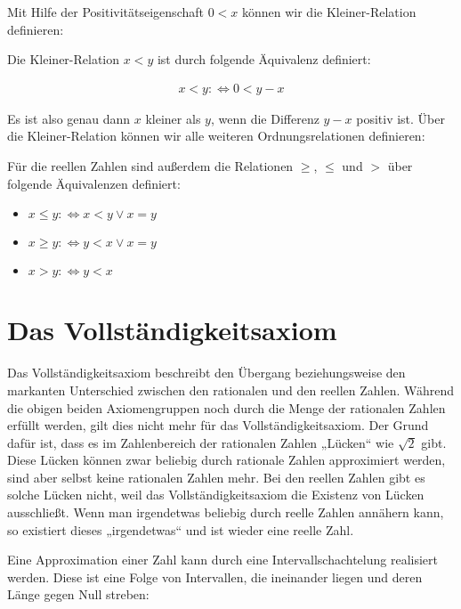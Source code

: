 \documentclass[fontsize=9pt,
               parskip=half-,
               DIV=14,
               listof=chapterentry,
               tocflat]{scrbook}
\begin{document}
Mit Hilfe der Positivitätseigenschaft $0<x$ können wir die Kleiner-Relation definieren:

\begin{definition*}
Die Kleiner-Relation $x<y$ ist durch folgende Äquivalenz definiert:

\begin{align*}
x<y:\iff 0<y-x
\end{align*}

\end{definition*}

Es ist also genau dann $x$ kleiner als $y$, wenn die Differenz $y-x$ positiv ist. Über die Kleiner-Relation können wir alle weiteren Ordnungsrelationen definieren:

\begin{definition*}
Für die reellen Zahlen sind außerdem die Relationen $\geq $, $\leq $ und $>$ über folgende Äquivalenzen definiert:

\begin{itemize}
\item $x\leq y:\iff x<y\lor x=y$
\item $x\geq y:\iff y<x\lor x=y$
\item $x>y:\iff y<x$
\end{itemize}

\end{definition*}

\section{Das Vollständigkeitsaxiom}

Das Vollständigkeitsaxiom beschreibt den Übergang beziehungsweise den markanten Unterschied zwischen den rationalen und den reellen Zahlen. Während die obigen beiden Axiomengruppen noch durch die Menge der rationalen Zahlen erfüllt werden, gilt dies nicht mehr für das Vollständigkeitsaxiom. Der Grund dafür ist, dass es im Zahlenbereich der rationalen Zahlen „Lücken“ wie ${\sqrt {2}}$ gibt. Diese Lücken können zwar beliebig durch rationale Zahlen approximiert werden, sind aber selbst keine rationalen Zahlen mehr. Bei den reellen Zahlen gibt es solche Lücken nicht, weil das Vollständigkeitsaxiom die Existenz von Lücken ausschließt. Wenn man irgendetwas beliebig durch reelle Zahlen annähern kann, so existiert dieses „irgendetwas“ und ist wieder eine reelle Zahl.

Eine Approximation einer Zahl kann durch eine Intervallschachtelung realisiert werden. Diese ist eine Folge von Intervallen, die ineinander liegen und deren Länge gegen Null streben:
\end{document}
